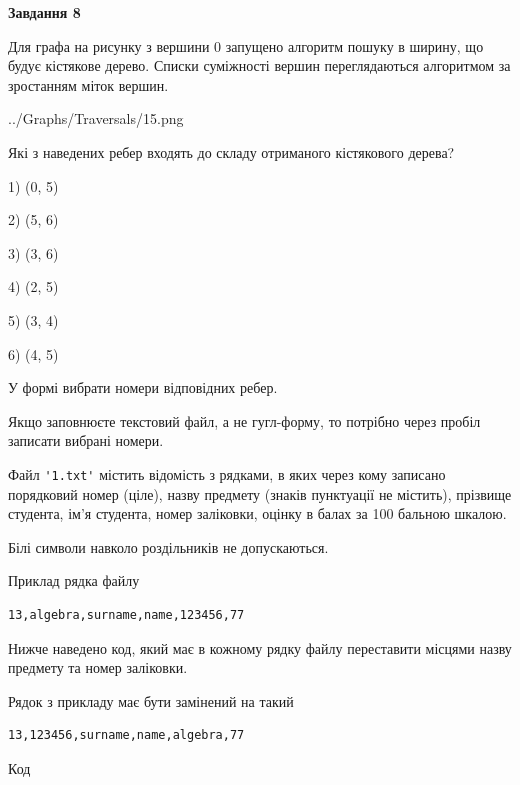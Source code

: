 \documentclass[12pt, ukrainian]{article}
\def\code#1{\Verb!#1!}
\begin{document}
{\begin {large}
{\begin {center}\textbf{Завдання 8}\end {center}}\par
Для графа на рисунку з вершини 0 запущено алгоритм пошуку в ширину, що будує кістякове дерево. Списки суміжності вершин переглядаються алгоритмом за зростанням міток вершин.\par
\begin{center}
	{../Graphs/Traversals/15.png}
\end{center}
\par Які з наведених ребер входять до складу отриманого кістякового дерева?\par
1) (0, 5)\par
2) (5, 6)\par
3) (3, 6)\par
4) (2, 5)\par
5) (3, 4)\par
6) (4, 5)\par
{\vskip 15pt} У формі вибрати номери відповідних ребер.


Якщо заповнюєте текстовий файл, а не гугл-форму, то потрібно через пробіл записа\-ти вибрані номери.\par
\newpage


Файл \code{'1.txt'} містить відомість з рядками, в яких через кому записано поряд\-ковий номер (ціле), назву предмету (знаків пунктуації не містить), прізвище студента, ім'я студента, номер заліковки, оцінку в балах за 100 бальною шкалою.

Білі символи навколо роздільників не допускаються.

Приклад рядка файлу



\begin{verbatim}
13,algebra,surname,name,123456,77
\end{verbatim}


Нижче наведено код, який має в кожному рядку файлу переставити місцями назву предмету та номер заліковки.

Рядок з прикладу має бути замінений на такий



\begin{verbatim}
13,123456,surname,name,algebra,77
\end{verbatim}




Код




\end{large}}
\end{document}
